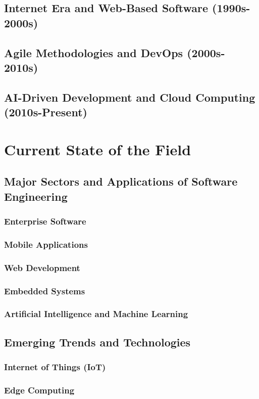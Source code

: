 \begin{refsection}
\subsection{Internet Era and Web-Based Software (1990s-2000s)}
\subsection{Agile Methodologies and DevOps (2000s-2010s)}
\subsection{AI-Driven Development and Cloud Computing (2010s-Present)}

\newpage

\section{Current State of the Field}
\subsection{Major Sectors and Applications of Software Engineering}
\subsubsection{Enterprise Software}
\subsubsection{Mobile Applications}
\subsubsection{Web Development}
\subsubsection{Embedded Systems}
\subsubsection{Artificial Intelligence and Machine Learning}
\subsection{Emerging Trends and Technologies}
\subsubsection{Internet of Things (IoT)}
\subsubsection{Edge Computing}

\end{refsection}
